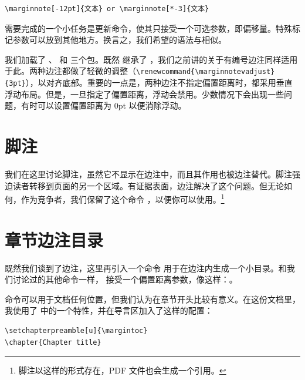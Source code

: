 \begin{lstlisting}[style=kaolstplain]
\marginnote[-12pt]{文本} or \marginnote[*-3]{文本}
\end{lstlisting}

\begin{kaobox}[frametitle=待办]
需要完成的一个小任务是更新命令，使其只接受一个可选参数，即偏移量。特殊标记参数可以放到其他地方。换言之，我们希望的语法与相似。
\end{kaobox}

我们加载了 、 和  三个包。既然  继承了 ，我们之前讲的关于有编号边注同样适用于此。两种边注都做了轻微的调整（\texttt{\textbackslash renewcommand\{\textbackslash marginnote\linebreak vadjust\}\{3pt\}}），以对齐底部。重要的一点是，两种边注不指定偏置距离时，都采用垂直浮动布局。但是，一旦指定了偏置距离，浮动会禁用。少数情况下会出现一些问题，有时可以设置偏置距离为 0pt 以便消除浮动。

\section{脚注}

我们在这里讨论脚注，虽然它不显示在边注中，而且其作用也被边注替代。脚注强迫读者转移到页面的另一个区域。有证据表面，边注解决了这个问题。但无论如何，作为竞争者，我们保留了这个命令 ，以便你可以使用。\footnote{脚注以这样的形式存在，PDF 文件也会生成一个引用。}

\section{章节边注目录}

既然我们谈到了边注，这里再引入一个命令  用于在边注内生成一个小目录。和我们讨论过的其他命令一样， 接受一个偏置距离参数，像这样：。

命令可以用于文档任何位置，但我们认为在章节开头比较有意义。在这份文档里，我使用了 \KOMAScript 中的一个特性，并在导言区加入了这样的配置：


\begin{lstlisting}[style=kaolstplain]
\setchapterpreamble[u]{\margintoc}
\chapter{Chapter title}
\end{lstlisting}

